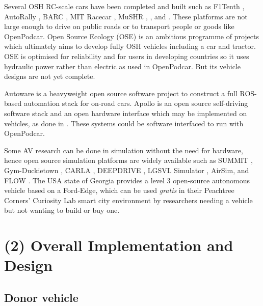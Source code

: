 \documentclass[a4paper]{article}
\begin{document}
	Several OSH RC-scale cars have been completed and built such as F1Tenth \cite{f1tenth}, AutoRally \cite{goldfain2019autorally}, BARC \cite{gonzales2018planning}, MIT Racecar \cite{mit}, MuSHR \cite{mushr}, \cite{nakamoto2019development}, and \cite{vincke2021open}. These platforms are not large enough to drive on public roads or to transport people or goods like OpenPodcar. Open Source Ecology (OSE) \cite{jakubowski2003open} is an ambitious programme of projects which ultimately aims to develop fully OSH vehicles including a car and tractor. OSE is optimised for reliability and for users in developing countries so it uses hydraulic power rather than electric as used in OpenPodcar. But its vehicle designs are not yet complete.
	
	Autoware \cite{kato2018autoware} is a heavyweight open source software project to construct a full ROS-based automation stack for on-road cars. Apollo \cite{apolloautoapollo} is an open source self-driving software stack and an open hardware interface which may be implemented on vehicles, as done in \cite{kessler2019bridging}. These systems could be software interfaced to run with OpenPodcar. 
	
	Some AV research can be done in simulation without the need for hardware, hence open source simulation platforms are widely available such as SUMMIT \cite{cai2020summit}, Gym-Duckietown \cite{chevalier-boisvert2018duckietown}, CARLA \cite{dosovitskiy2017carla}, DEEPDRIVE \cite{quiterdeepdrive}, LGSVL Simulator \cite{rong2020lgsvl}, AirSim\cite{shah2017airsim}, and FLOW \cite{wu2017flow}. The USA state of Georgia provides a level 3 open-source autonomous vehicle based on a Ford-Edge\cite{peachtreecuriosity}, which can be used {\em gratis} in their Peachtree Corners' Curiosity Lab smart city environment by researchers needing a vehicle but not wanting to build or buy one.
	
	\section{(2) Overall Implementation and Design}\label{h.1u7vph94gfbt}
	
	\subsection{Donor vehicle}
	
\end{document}
